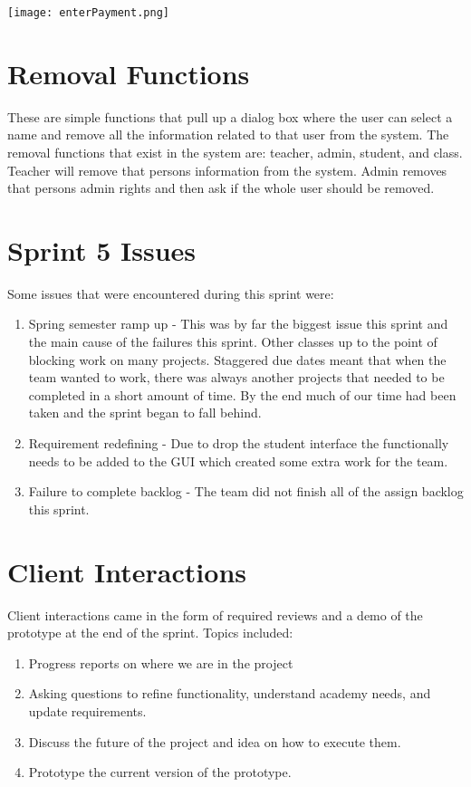 \documentclass[11pt]{book}
\begin{document}
\texttt{[image: enterPayment.png]}


\section{Removal Functions}
These are simple functions that pull up a dialog box where the user can select a name and remove all the information related to that user from the system. The removal functions that exist in the system are: teacher, admin, student, and class. Teacher will remove that persons information from the system. Admin removes that persons admin rights and then ask if the whole user should be removed.


\section{Sprint 5 Issues}
Some issues that were encountered during this sprint were:

\begin{enumerate}
\item Spring semester ramp up - This was by far the biggest issue this sprint and the main cause of the failures this sprint. Other classes  up to the point of blocking work on many projects. Staggered due dates meant that when the team wanted to work, there was always another projects that needed to be completed in a short amount of time. By the end much of our time had been taken and the sprint began to fall behind.  
\item Requirement redefining - Due to drop the student interface the functionally needs to be added to the GUI which created some extra work for the team. 
\item Failure to complete backlog - The team did not finish all of the assign backlog this sprint.
\end{enumerate}

\section{Client Interactions}

Client interactions came in the form of required reviews and a demo of the prototype at the end of the sprint. Topics included:

\begin{enumerate}
\item Progress reports on where we are in the project
\item Asking questions to refine functionality, understand academy needs, and update requirements.
\item Discuss the future of the project and idea on how to execute them.
\item Prototype the current version of the prototype.
\end{enumerate}
\end{document}
